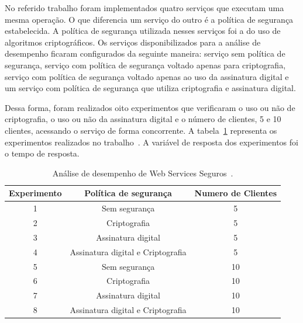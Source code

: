 No referido trabalho foram implementados quatro serviços que executam uma mesma operação. O que diferencia um serviço do outro é a política de segurança estabelecida. A política de segurança utilizada nesses serviços foi a do uso de algoritmos criptográficos. Os serviços disponibilizados para a análise de desempenho ficaram configurados da seguinte maneira: serviço sem política de segurança, serviço com política de segurança voltado apenas para criptografia, serviço com política de segurança voltado apenas ao uso da assinatura digital e um serviço com política de segurança que utiliza criptografia e assinatura digital.

Dessa forma, foram realizados oito experimentos que verificaram o uso ou não de criptografia, o uso ou não da assinatura digital e o número de clientes, 5 e 10 clientes, acessando o serviço de forma concorrente. A tabela~\ref{tb:expWSSecurity} representa os experimentos realizados no trabalho~\cite{rodrigues2011analysis}. A variável de resposta dos experimentos foi o tempo de resposta.

\begin{table}[h]
\begin{center}
\begin{tabular}{|c|c|c|}
\hline
\textbf{Experimento} & \textbf{Política de segurança}     & \textbf{Numero de Clientes} \\ \hline
1                    & Sem segurança                      & 5                           \\ \hline
2                    & Criptografia                       & 5                           \\ \hline
3                    & Assinatura digital                 & 5                           \\ \hline
4                    & Assinatura digital e Criptografia  & 5                           \\ \hline
5                    & Sem segurança                      & 10                           \\ \hline
6                    & Criptografia                       & 10                           \\ \hline
7                    & Assinatura digital                 & 10                           \\ \hline
8                    & Assinatura digital e Criptografia  & 10                          \\ \hline
\end{tabular}\caption {Análise de desempenho de Web Services Seguros~\cite{rodrigues2011analysis}.}\label{tb:expWSSecurity}
\end{center}
\end{table}


